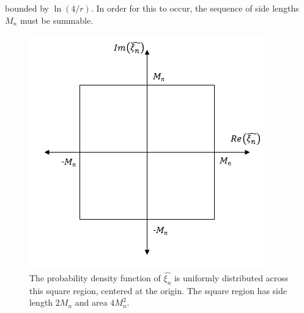 bounded by $\ln(4/r)$. In order for this to occur, the sequence of side lengths $M_n$ must be summable. 
\begin{figure}[!h]
\caption[Uniform distribution over a square region]{The probability
  density function of $\hat{\xi_n}$ is uniformly distributed across
  this square region, centered at the origin. The square region has
  side length $2M_n$ and area $4M_n^2$.}\label{fig:square}
	\begin{center}
		\includegraphics[scale=0.7]{figs/square.png}
	\end{center}
\end{figure}

